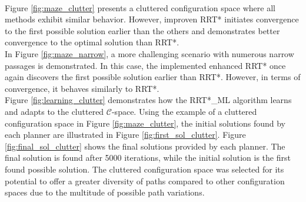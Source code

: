 \documentclass{ctuthesis}
\begin{document}
\\
Figure \ref{fig:maze_clutter} presents a cluttered configuration space where all methods exhibit similar behavior. 
However, improven RRT* initiates convergence to the first possible solution earlier than the others and 
demonstrates better convergence to the optimal solution than RRT*.
\\[12pt]
In Figure \ref{fig:maze_narrow}, 
a more challenging scenario with numerous narrow passages is demonstrated. 
In this case, 
the implemented enhanced RRT* once again discovers the first possible solution earlier than RRT*. 
However, in terms of convergence, it behaves similarly to RRT*.
\\[12pt]
Figure \ref{fig:learning_clutter} demonstrates how 
the RRT*\_ML algorithm learns and adapts to the cluttered $\mathcal{C}$-space. 
Using the example of a cluttered configuration space in Figure \ref{fig:maze_clutter}, 
the initial solutions found by each planner are illustrated in Figure \ref{fig:first_sol_clutter}. 
Figure \ref{fig:final_sol_clutter} shows the final solutions provided by each planner. 
The final solution is found after 5000 iterations, 
while the initial solution is the first found possible solution.
The cluttered configuration space was selected for its potential to offer a greater diversity 
of paths compared to other configuration spaces due to the multitude of possible path variations.
\end{document}
